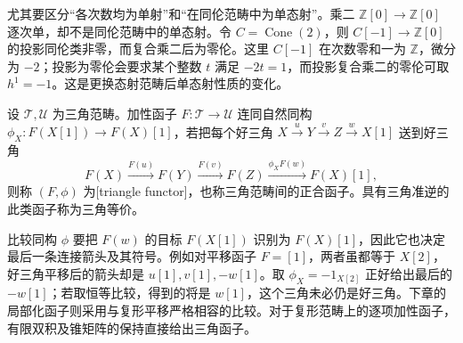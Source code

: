 \ProseParagraphBreak
尤其要区分“各次数均为单射”和“在同伦范畴中为单态射”。乘二 \(\mathbb Z[0]\to\mathbb Z[0]\) 逐次单，却不是同伦范畴中的单态射。令 \(C=\operatorname{Cone}(2)\)，则 \(C[-1]\to\mathbb Z[0]\) 的投影同伦类非零，而复合乘二后为零伦。这里 \(C[-1]\) 在次数零和一为 \(\mathbb Z\)，微分为 \(-2\)；投影为零伦会要求某个整数 \(t\) 满足 \(-2t=1\)，而投影复合乘二的零伦可取 \(h^1=-1\)。这是更换态射范畴后单态射性质的变化。

\begin{definition}\label{b4:def:triangle-functor}
	设 \(\mathcal T,\mathcal U\) 为三角范畴。加性函子 \(F:\mathcal T\to\mathcal U\) 连同自然同构 \(\phi_X:F(X[1])\to F(X)[1]\)，若把每个好三角 \(X\xrightarrow{u}Y\xrightarrow{v}Z\xrightarrow{w}X[1]\) 送到好三角
	\[
		F(X)\xrightarrow{F(u)}F(Y)\xrightarrow{F(v)}F(Z) \xrightarrow{\phi_XF(w)}F(X)[1],
	\]
	则称 \((F,\phi)\) 为[triangle functor]，也称三角范畴间的正合函子。具有三角准逆的此类函子称为三角等价。
\end{definition}

比较同构 \(\phi\) 要把 \(F(w)\) 的目标 \(F(X[1])\) 识别为 \(F(X)[1]\)，因此它也决定最后一条连接箭头及其符号。例如对平移函子 \(F=[1]\)，两者虽都等于 \(X[2]\)，好三角平移后的箭头却是 \(u[1],v[1],-w[1]\)。取 \(\phi_X=-1_{X[2]}\) 正好给出最后的 \(-w[1]\)；若取恒等比较，得到的将是 \(w[1]\)，这个三角未必仍是好三角。下章的局部化函子则采用与复形平移严格相容的比较。对于复形范畴上的逐项加性函子，有限双积及锥矩阵的保持直接给出三角函子。

